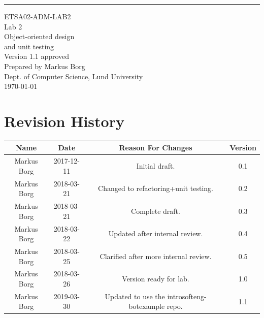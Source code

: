 \documentclass{scrreprt}
\date{}
\def\myversion{1.1 }
\begin{document}
\begin{flushright}
    \rule{16cm}{5pt}\vskip1cm
    \begin{bfseries}
    	\LARGE{ETSA02-ADM-LAB2}\\
    	\vspace{1.5cm}
        \Huge{Lab 2}\\
        \vspace{0.5cm}
        Object-oriented design\\
        \vspace{0.5cm}
        and unit testing\\
        \vspace{1.5cm}
        \LARGE{Version \myversion approved}\\
        \vspace{1.5cm}
        Prepared by Markus Borg\\
        Dept. of Computer Science, Lund University\\
        \vspace{1.5cm}
        \today\\
    \end{bfseries}
\end{flushright}


\chapter*{Revision History}

\begin{center}
    \begin{tabular}{|c|c|c|c|}
        \hline
	    Name & Date & Reason For Changes & Version\\
        \hline
	    Markus Borg & 2017-12-11 & Initial draft. & 0.1\\
        \hline
        Markus Borg & 2018-03-21 & Changed to refactoring+unit testing. & 0.2\\
        \hline
        Markus Borg & 2018-03-21 & Complete draft. & 0.3\\
        \hline
        Markus Borg & 2018-03-22 & Updated after internal review. & 0.4\\
        \hline
        Markus Borg & 2018-03-25 & Clarified after more internal review. & 0.5\\
        \hline
        Markus Borg & 2018-03-26 & Version ready for lab. & 1.0\\
        \hline
        Markus Borg & 2019-03-30 & Updated to use the introsofteng-botexample repo. & 1.1\\
        \hline
    \end{tabular}
\end{center}
\end{document}
